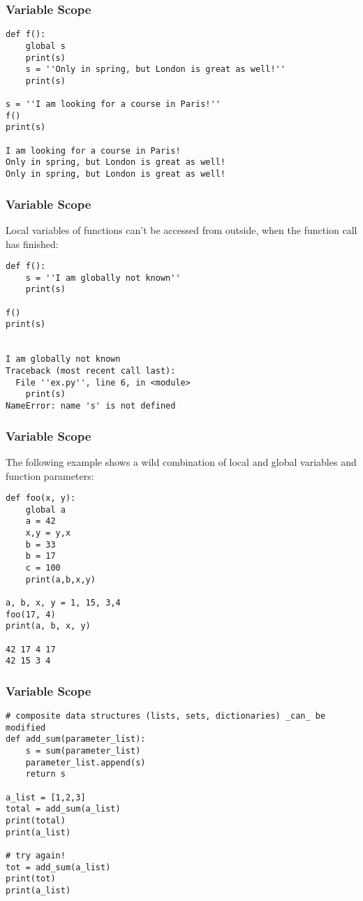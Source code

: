 \begin{frame}[fragile]\frametitle{Variable Scope}

\begin{lstlisting}
def f():
    global s
    print(s)
    s = ''Only in spring, but London is great as well!''
    print(s)

s = ''I am looking for a course in Paris!'' 
f()
print(s)

I am looking for a course in Paris!
Only in spring, but London is great as well!
Only in spring, but London is great as well!
\end{lstlisting}

\end{frame}

\begin{frame}[fragile]\frametitle{Variable Scope}
Local variables of functions can't be accessed from outside, when the function call has finished:
\begin{lstlisting}
def f():
    s = ''I am globally not known''
    print(s) 

f()
print(s)


I am globally not known
Traceback (most recent call last):
  File ''ex.py'', line 6, in <module>
    print(s)
NameError: name 's' is not defined
\end{lstlisting}
\end{frame}


\begin{frame}[fragile]\frametitle{Variable Scope}
The following example shows a wild combination of local and global variables and function parameters:
\begin{lstlisting}
def foo(x, y):
    global a
    a = 42
    x,y = y,x
    b = 33
    b = 17
    c = 100
    print(a,b,x,y)

a, b, x, y = 1, 15, 3,4 
foo(17, 4)
print(a, b, x, y)

42 17 4 17
42 15 3 4
\end{lstlisting}
\end{frame}



\begin{frame}[fragile]\frametitle{Variable Scope}
\begin{lstlisting}
# composite data structures (lists, sets, dictionaries) _can_ be modified
def add_sum(parameter_list):
    s = sum(parameter_list)
    parameter_list.append(s)
    return s

a_list = [1,2,3]
total = add_sum(a_list)
print(total)
print(a_list)

# try again!
tot = add_sum(a_list)
print(tot)
print(a_list)

\end{lstlisting}
\end{frame}


